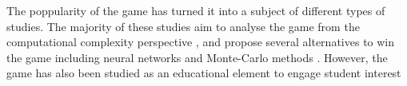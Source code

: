 The poppularity of the game has turned it into a subject of different types of studies. The majority of these studies aim to analyse the game from the computational complexity perspective \citep{abdelkader20162048}, and propose several alternatives to win the game including neural networks \citep{boris2016evolving} and Monte-Carlo methods \citep{rodgers2014investigation}. However, the game has also been studied as an educational element to engage student interest \citep{neller2015pedagogical}

